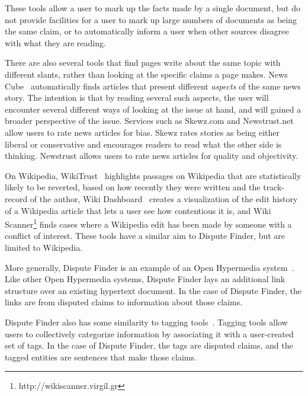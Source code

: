 \documentclass{www2010-submission}
\newcommand{\todo}[1]{}
\begin{document}
These tools allow a user to mark up the facts made by a single document, but do not provide facilities for a user to mark up large numbers of documents as being the same claim, or to automatically inform a user when other sources disagree with what they are reading.

There are also several tools that find pages write about the same topic with different slants, rather than looking at the specific claims a page makes. News Cube~\cite{Park2009} automatically finds articles that present different {\it aspects} of the same news story. The intention is that by reading several such aspects, the user will encounter several different ways of looking at the issue at hand, and will gained a broader perspective of the issue. 
Services such as Skewz.com and Newstrust.net allow users to rate news articles for bias. Skewz rates stories as being either liberal or conservative and encourages readers to read what the other side is thinking. Newstrust allows users to rate news articles for quality and objectivity. 

On Wikipedia, WikiTrust~\cite{Adler2008a} highlights passages on Wikipedia that are statistically likely to be reverted, based on how recently they were written and the track-record of the author, Wiki Dashboard~\cite{Kittur2008} creates a visualization of the edit history of a Wikipedia article that lets a user see how contentious it is, and Wiki Scanner\footnote{http://wikiscanner.virgil.gr} finds cases where a Wikipedia edit has been made by someone with a conflict of interest. These tools have a similar aim to Dispute Finder, but are limited to Wikipedia.

More generally, Dispute Finder is an example of an Open Hypermedia system~\cite{Bouvin2000,Wiil1996}. Like other Open Hypermedia systems, Dispute Finder lays an additional link structure over an existing hypertext document. In the case of Dispute Finder, the links are from disputed claims to information about those claims.

Dispute Finder also has some similarity to tagging tools~\cite{Marlow2006,Golder2006}. Tagging tools allow users to collectively categorize information by associating it with a user-created set of tags. In the case of Dispute Finder, the tags are disputed claims, and the tagged entities are sentences that make those claims. 


\todo{Improve the paraphraser UI so it shows users what pages are making the claim}
\todo{Improve the ``see examples on the web'' UI to it shows the pages that were found with the activists training work}
\todo{Provide a customized RSS reader and search engine that does dispute tracking. - future work?}
\todo{Should we explicitly list what we think are our key contributions?}
\end{document}
